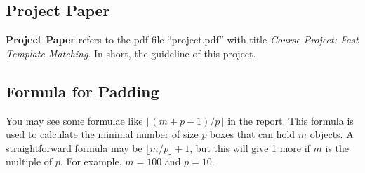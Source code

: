 \documentclass[12pt, a4paper]{article}
\begin{document}
  \subsection{Project Paper}
    \textbf{Project Paper} refers to the pdf file ``project.pdf'' with title
    \textit{Course Project: Fast Template Matching}. In short, the guideline
    of this project.
  \subsection{Formula for Padding}
    You may see some formulae like $\lfloor(m+p-1)/p\rfloor$ in the report. This
    formula is used to calculate the minimal number of size $p$ boxes that can
    hold $m$ objects. A straightforward formula may be $\lfloor m/p\rfloor+1$,
    but this will give 1 more if $m$ is the multiple of $p$. For example, $m=100$
    and $p=10$.
\end{document}
